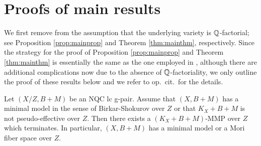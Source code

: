 	
	
	
	\section{Proofs of main results}
	\label{section:proofs_main_results}
	
	We first remove from \cite[Proposition A.3 and Theorem 1.2]{LT22b} the assumption that the underlying variety is $ \mathbb{Q} $-factorial; see Proposition \ref{prop:mainprop} and Theorem \ref{thm:mainthm}, respectively. 
	Since the strategy for the proof of Proposition \ref{prop:mainprop} and Theorem \ref{thm:mainthm} is essentially the same as the one employed in \cite{LT22b}, although there are additional complications now due to the absence of $\mathbb{Q}$-factoriality, we only outline the proof of these results below and we refer to op.\ cit.\ for the details.
	
	\begin{prop}\label{prop:mainprop}
		Let $ (X/Z,B+M) $ be an NQC lc g-pair. Assume that $ (X,B+M) $ has a minimal model in the sense of Birkar-Shokurov over $ Z $ or that $ K_X+B+M $ is not pseudo-effective over $ Z $. Then there exists a $ (K_X + B + M) $-MMP over $Z$ which terminates. In particular, $ (X,B+M) $ has a minimal model or a Mori fiber space over $ Z $.
	\end{prop}
	
